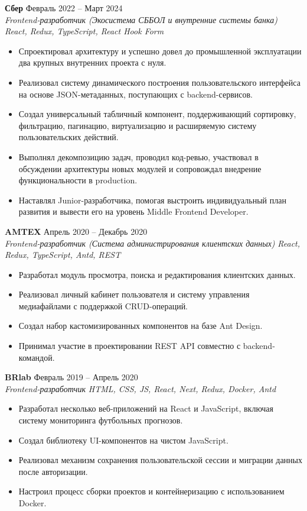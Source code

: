 \documentclass[10pt,a4paper]{article}
\begin{document}
\vspace{8pt}
\noindent \small
\textbf{Сбер} \hfill Февраль 2022 -- Март 2024 \\
\textit{Frontend-разработчик (Экосистема СББОЛ и внутренние системы банка)} \hfill \textit{React, Redux, TypeScript, React Hook Form} 
\begin{itemize}
  \item Спроектировал архитектуру и успешно довел до промышленной эксплуатации два крупных внутренних проекта с нуля. 
  \item Реализовал систему динамического построения пользовательского интерфейса на основе JSON-метаданных, поступающих с backend-сервисов.
  \item Создал универсальный табличный компонент, поддерживающий сортировку, фильтрацию, пагинацию, виртуализацию и расширяемую систему пользовательских действий.
  \item Выполнял декомпозицию задач, проводил код-ревью, участвовал в обсуждении архитектуры новых модулей и сопровождал внедрение функциональности в production.
  \item Наставлял Junior-разработчика, помогая выстроить индивидуальный план развития и вывести его на уровень Middle Frontend Developer.
\end{itemize}

\vspace{8pt}
\noindent \small
\textbf{AMTEX} \hfill Апрель 2020 -- Декабрь 2020 \\
\textit{Frontend-разработчик (Система администрирования клиентских данных)} \hfill \textit{React, Redux, TypeScript, Antd, REST} 
\begin{itemize}
  \item Разработал модуль просмотра, поиска и редактирования клиентских данных.
  \item Реализовал личный кабинет пользователя и систему управления медиафайлами с поддержкой CRUD-операций.
  \item Создал набор кастомизированных компонентов на базе Ant Design.
  \item Принимал участие в проектировании REST API совместно с backend-командой.
\end{itemize}

\vspace{8pt}
\noindent \small
\textbf{BRlab} \hfill Февраль 2019 -- Апрель 2020 \\
\textit{Frontend-разработчик} \hfill \textit{HTML, CSS, JS, React, Next, Redux, Docker, Antd} 
\begin{itemize}
  \item Разработал несколько веб-приложений на React и JavaScript, включая систему мониторинга футбольных прогнозов. 
  \item Создал библиотеку UI-компонентов на чистом JavaScript.
  \item Реализовал механизм сохранения пользовательской сессии и миграции данных после авторизации. 
  \item Настроил процесс сборки проектов и контейнеризацию с использованием Docker. 
\end{itemize}
\end{document}
